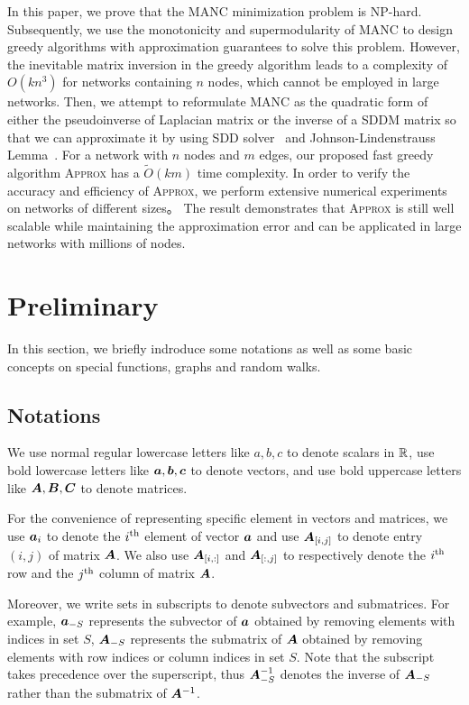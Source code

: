 \documentclass[sigconf]{acmart}
\begin{document}
In this paper, we prove that the MANC minimization problem is NP-hard.
Subsequently, we use the monotonicity and supermodularity of MANC to design greedy algorithms with approximation guarantees to solve this problem.
However, the inevitable matrix inversion in the greedy algorithm leads to a complexity of \(O(kn^3)\) for networks containing \(n\) nodes, which cannot be employed in large networks.
Then, we attempt to reformulate MANC as the quadratic form of either the pseudoinverse of Laplacian matrix or the inverse of a SDDM matrix so that we can approximate it by using SDD solver~\cite{CoKyMiPaJaPeRaXu14,SpTe14,GaKySp23} and Johnson-Lindenstrauss Lemma~\cite{JoLi84}.
For a network with \(n\) nodes and \(m\) edges, our proposed fast greedy algorithm \textsc{Approx} has a \(\tilde{O}(km)\) time complexity.
In order to verify the accuracy and efficiency of \textsc{Approx}, we perform extensive numerical experiments on networks of different sizes。
The result demonstrates that \textsc{Approx} is still well scalable while maintaining the approximation error and can be applicated in large networks with millions of nodes.

\section{Preliminary}\label{sec:prelim}

In this section, we briefly indroduce some notations as well as some basic concepts on special functions, graphs and random walks.

\subsection{Notations}

We use normal regular lowercase letters like \(a,b,c\) to denote scalars in \(\mathbb{R}\), use bold lowercase letters like \(\boldsymbol{a},\boldsymbol{b},\boldsymbol{c}\) to denote vectors, and use bold uppercase letters like \(\boldsymbol{A},\boldsymbol{B},\boldsymbol{C}\) to denote matrices.

For the convenience of representing specific element in vectors and matrices, we use \(\boldsymbol{a}_{i}\) to denote the \({i}^{\rm{th}}\) element of vector \(\boldsymbol{a}\) and use \(\boldsymbol{A}_{[i,j]}\) to denote entry \((i,j)\) of matrix \(\boldsymbol{A}\).
We also use \(\boldsymbol{A}_{[i,:]}\) and \(\boldsymbol{A}_{[:,j]}\) to respectively denote the \({i}^{\rm{th}}\) row and the \({j}^{\rm{th}}\) column of matrix \(\boldsymbol{A}\).

Moreover, we write sets in subscripts to denote subvectors and submatrices.
For example, \(\boldsymbol{a}_{-S}\) represents the subvector of \(\boldsymbol{a}\) obtained by removing elements with indices in set \(S\), \(\boldsymbol{A}_{-S}\) represents the submatrix of \(\boldsymbol{A}\) obtained by removing elements with row indices or column indices in set \(S\).
Note that the subscript takes precedence over the superscript, thus \(\boldsymbol{A}_{-S}^{-1}\) denotes the inverse of \(\boldsymbol{A}_{-S}\) rather than the submatrix of \(\boldsymbol{A}^{-1}\).
\end{document}
